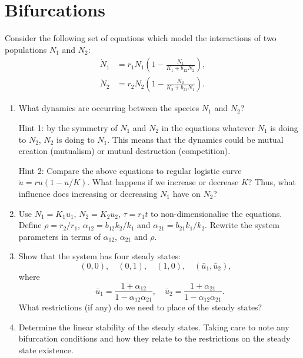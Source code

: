 \documentclass[]{article}
\newcommand{\bb}{\begin{equation}}
\newcommand{\ee}{\end{equation}}
\renewcommand{\l}{\left(}
\renewcommand{\r}{\right)}
\begin{document}
\section{Bifurcations}
Consider the following set of equations which model the interactions of two populations $N_1$ and $N_2$:
\begin{align}
\dot{N}_1&=r_1N_1\l 1-\frac{N_1}{K_1+b_{12}N_2}\r,\\
\dot{N}_2&=r_2N_2\l 1-\frac{N_2}{K_2+b_{21}N_1}\r.
\end{align}
\begin{enumerate}
\item What dynamics are occurring between the species $N_1$ and $N_2$?

Hint 1: by the symmetry of $N_1$ and $N_2$ in the equations whatever $N_1$ is doing to $N_2$, $N_2$ is doing to $N_1$. This means that the dynamics could be mutual creation (mutualism) or mutual destruction (competition).

Hint 2: Compare the above equations to regular logistic curve $\dot{u}=ru(1-u/K)$. What happens if we increase or decrease $K$? Thus, what influence does increasing or decreasing $N_1$ have on $N_2$?

\item Use $N_1=K_1u_1$, $N_2=K_2u_2$, $\tau=r_1t$ to non-dimensionalise the equations. Define $\rho=r_2/r_1$, $\alpha_{12}=b_{12}k_2/k_1$ and $\alpha_{21}=b_{21}k_1/k_2$. Rewrite the system parameters in terms of $\alpha_{12}$, $\alpha_{21}$ and $\rho$.

\item Show that the system has four steady states:
\bb
(0,0), \quad (0,1), \quad (1,0), \quad (\bar{u}_1,\bar{u}_2), \quad
\ee
where
\bb
\bar{u}_1=\frac{1+\alpha_{12}}{1-\alpha_{12}\alpha_{21}},\quad\bar{u}_2=\frac{1+\alpha_{21}}{1-\alpha_{12}\alpha_{21}}.
\ee
What restrictions (if any) do we need to place of the steady states?
\item Determine the linear stability of the steady states. Taking care to note any bifurcation conditions and how they relate to the restrictions on the steady state existence.
\end{enumerate}
\end{document}
